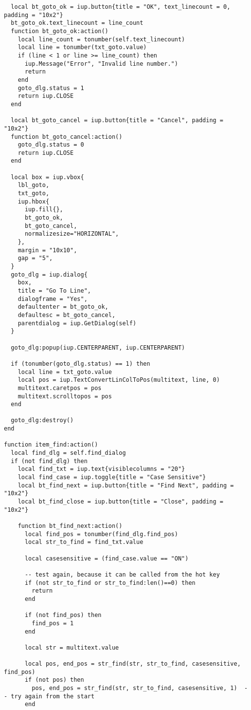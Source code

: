 \documentclass{ctexart}
\begin{document}
\begin{lstlisting}
  local bt_goto_ok = iup.button{title = "OK", text_linecount = 0, padding = "10x2"} 
  bt_goto_ok.text_linecount = line_count
  function bt_goto_ok:action()
    local line_count = tonumber(self.text_linecount)
    local line = tonumber(txt_goto.value)
    if (line < 1 or line >= line_count) then
      iup.Message("Error", "Invalid line number.")
      return
    end
    goto_dlg.status = 1
    return iup.CLOSE
  end

  local bt_goto_cancel = iup.button{title = "Cancel", padding = "10x2"}
  function bt_goto_cancel:action()
    goto_dlg.status = 0
    return iup.CLOSE
  end

  local box = iup.vbox{
    lbl_goto,
    txt_goto,
    iup.hbox{
      iup.fill{},
      bt_goto_ok,
      bt_goto_cancel,
      normalizesize="HORIZONTAL", 
    },
    margin = "10x10", 
    gap = "5",
  }
  goto_dlg = iup.dialog{
    box,
    title = "Go To Line", 
    dialogframe = "Yes", 
    defaultenter = bt_goto_ok, 
    defaultesc = bt_goto_cancel,
    parentdialog = iup.GetDialog(self)
  }

  goto_dlg:popup(iup.CENTERPARENT, iup.CENTERPARENT)

  if (tonumber(goto_dlg.status) == 1) then
    local line = txt_goto.value
    local pos = iup.TextConvertLinColToPos(multitext, line, 0)
    multitext.caretpos = pos
    multitext.scrolltopos = pos
  end

  goto_dlg:destroy()
end

function item_find:action()
  local find_dlg = self.find_dialog
  if (not find_dlg) then
    local find_txt = iup.text{visiblecolumns = "20"}
    local find_case = iup.toggle{title = "Case Sensitive"}
    local bt_find_next = iup.button{title = "Find Next", padding = "10x2"}
    local bt_find_close = iup.button{title = "Close", padding = "10x2"}

    function bt_find_next:action()
      local find_pos = tonumber(find_dlg.find_pos)
      local str_to_find = find_txt.value

      local casesensitive = (find_case.value == "ON")

      -- test again, because it can be called from the hot key
      if (not str_to_find or str_to_find:len()==0) then
        return
      end

      if (not find_pos) then
        find_pos = 1
      end

      local str = multitext.value

      local pos, end_pos = str_find(str, str_to_find, casesensitive, find_pos)
      if (not pos) then
        pos, end_pos = str_find(str, str_to_find, casesensitive, 1)  -- try again from the start
      end


\end{lstlisting}
\end{document}
